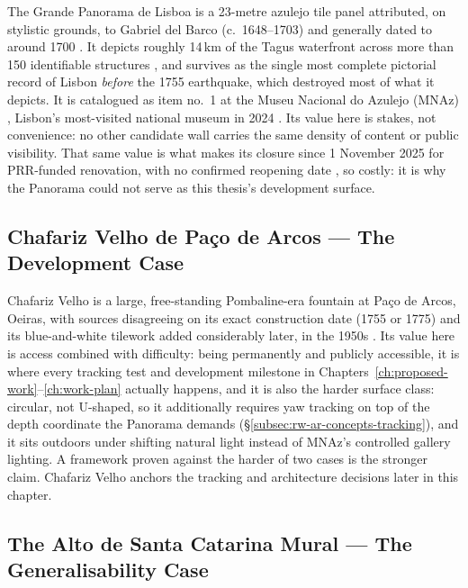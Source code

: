 The Grande Panorama de Lisboa is a 23-metre azulejo tile panel attributed,
on stylistic grounds, to Gabriel del Barco (c.~1648--1703) and generally
dated to around 1700 \cite{gacpanorama,baroqueartpanorama}. It depicts
roughly 14\,km of the Tagus waterfront across more than 150 identifiable
structures \cite{gacpanorama}, and survives as the single most complete
pictorial record of Lisbon \emph{before} the 1755 earthquake, which
destroyed most of what it depicts. It is catalogued as item no.~1 at the
Museu Nacional do Azulejo (MNAz) \cite{fcshpanorama}, Lisbon's
most-visited national museum in 2024 \cite{observador2025mnaz}. Its
value here is stakes, not convenience: no other candidate wall
carries the same density of content or public visibility. That same
value is what makes its closure since 1 November 2025 for PRR-funded
renovation, with no confirmed reopening date \cite{publico2025prr}, so
costly: it is why the Panorama could not serve as this thesis's
development surface.
 
\subsection{Chafariz Velho de Pa\c{c}o de Arcos --- The Development Case}
\label{subsec:pw-chafariz}
 
Chafariz Velho is a large, free-standing Pombaline-era fountain at
Pa\c{c}o de Arcos, Oeiras, with sources disagreeing on its exact
construction date (1755 or 1775) and its blue-and-white tilework added
considerably later, in the 1950s \cite{oeirasallabout2026,oeiraschafarizes2026}.
Its value here is access combined with difficulty: being permanently and
publicly accessible, it is where every tracking test and development
milestone in Chapters~\ref{ch:proposed-work}--\ref{ch:work-plan}
actually happens, and it is also the harder surface class: circular,
not U-shaped, so it additionally requires yaw tracking on top of the
depth coordinate the Panorama demands
(\S\ref{subsec:rw-ar-concepts-tracking}), and it sits outdoors under shifting
natural light instead of MNAz's controlled gallery lighting. A
framework proven against the harder of two cases is the stronger claim.
Chafariz Velho anchors the tracking and
architecture decisions later in this chapter.

\subsection{The Alto de Santa Catarina Mural --- The Generalisability Case}
\label{subsec:pw-generalisability}

